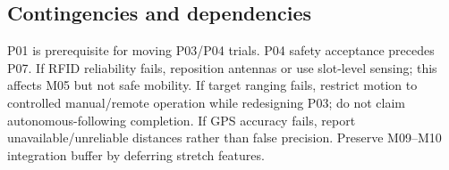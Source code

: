 \subsection{Contingencies and dependencies}
P01 is prerequisite for moving P03/P04 trials. P04 safety acceptance precedes P07. If RFID reliability fails, reposition antennas or use slot-level sensing; this affects M05 but not safe mobility. If target ranging fails, restrict motion to controlled manual/remote operation while redesigning P03; do not claim autonomous-following completion. If GPS accuracy fails, report unavailable/unreliable distances rather than false precision. Preserve M09--M10 integration buffer by deferring stretch features.\par
